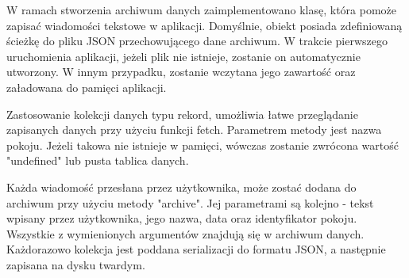 W ramach stworzenia archiwum danych zaimplementowano klasę, która pomoże zapisać wiadomości tekstowe w aplikacji. Domyślnie, obiekt posiada zdefiniowaną ścieżkę do pliku JSON przechowującego dane archiwum. W trakcie pierwszego uruchomienia aplikacji, jeżeli plik nie istnieje, zostanie on automatycznie utworzony. W innym przypadku, zostanie wczytana jego zawartość oraz załadowana do pamięci aplikacji.

Zastosowanie kolekcji danych typu rekord, umożliwia łatwe przeglądanie zapisanych danych przy użyciu funkcji fetch. Parametrem metody jest nazwa pokoju. Jeżeli takowa nie istnieje w pamięci, wówczas zostanie zwrócona wartość "undefined" lub pusta tablica danych.

Każda wiadomość przesłana przez użytkownika, może zostać dodana do archiwum przy użyciu metody "archive". Jej parametrami są kolejno - tekst wpisany przez użytkownika, jego nazwa, data oraz identyfikator pokoju. Wszystkie z wymienionych argumentów znajdują się w archiwum danych. Każdorazowo kolekcja jest poddana serializacji do formatu JSON, a następnie zapisana na dysku twardym.


